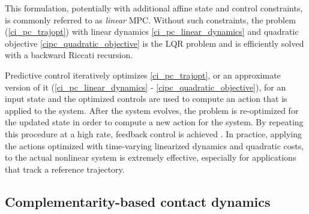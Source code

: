 This formulation, potentially with additional affine state and control constraints, is commonly referred to as \textit{linear} MPC. Without such constraints, the problem 
(\ref{ci_pc_trajopt}) with linear dynamics \eqref{ci_pc_linear_dynamics} and quadratic objective \eqref{cipc_quadratic_objective} is the LQR problem \cite{kalman1964lqr} and is efficiently solved with a backward Riccati recursion. 

Predictive control iteratively optimizes \eqref{ci_pc_trajopt}, or an approximate version of it (\ref{ci_pc_linear_dynamics} - \ref{cipc_quadratic_objective}), for an input state and the optimized controls are used to compute an action that is applied to the system. After the system evolves, the problem is re-optimized for the updated state in order to compute a new action for the system. By repeating this procedure at a high rate, feedback control is achieved \cite{wang2009fast}. In practice, applying the actions optimized with time-varying linearized dynamics and quadratic costs, to the actual nonlinear system is extremely effective, especially for applications that track a reference trajectory.

\subsection{Complementarity-based contact dynamics}

